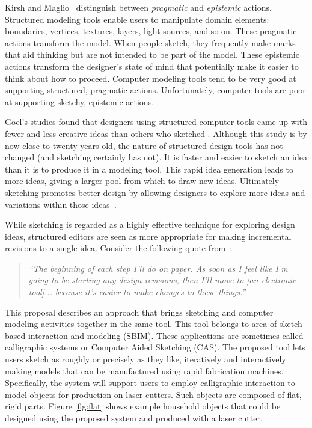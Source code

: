 \documentclass[11pt]{article}
\begin{document}
Kirsh and Maglio~\cite{kirch-epistemic-action} distinguish between
\textit{pragmatic} and \textit{epistemic} actions. Structured modeling
tools enable users to manipulate domain elements: boundaries,
vertices, textures, layers, light sources, and so on. These pragmatic
actions transform the model. When people sketch, they frequently make
marks that aid thinking but are not intended to be part of the
model. These epistemic actions transform the designer's state of mind
that potentially make it easier to think about how to
proceed. Computer modeling tools tend to be very good at supporting
structured, pragmatic actions. Unfortunately, computer tools are poor
at supporting sketchy, epistemic actions.

Goel's studies found that designers using structured computer tools
came up with fewer and less creative ideas than others who sketched
\cite{goel-sketches-of-thought}. Although this study is by now close
to twenty years old, the nature of structured design tools has not
changed (and sketching certainly has not). It is faster and easier to
sketch an idea than it is to produce it in a modeling tool. This rapid
idea generation leads to more ideas, giving a larger pool from which
to draw new ideas. Ultimately sketching promotes better design by
allowing designers to explore more ideas and variations within those
ideas~\cite{goel-sketches-of-thought,schon-kinds-of-seeing}.

While sketching is regarded as a highly effective technique for
exploring design ideas, structured editors are seen as more
appropriate for making incremental revisions to a single
idea. Consider the following quote from~\cite{newman-web-designers}:

\begin{quotation}
\textit{``The beginning of each step I'll do on paper. As soon as I feel
  like I'm going to be starting any design revisions, then I'll move
  to [an electronic tool]... because it's easier to make changes to
  these things.''}
\end{quotation}

This proposal describes an approach that brings sketching and computer
modeling activities together in the same tool. This tool belongs to
area of sketch-based interaction and modeling (SBIM). These
applications are sometimes called calligraphic systems or Computer
Aided Sketching (CAS). The proposed tool lets users sketch as roughly
or precisely as they like, iteratively and interactively making models
that can be manufactured using rapid fabrication
machines. Specifically, the system will support users to employ
calligraphic interaction to model objects for production on laser
cutters. Such objects are composed of flat, rigid parts. Figure
\ref{fig:flat} shows example household objects that could be designed
using the proposed system and produced with a laser cutter.
\end{document}
